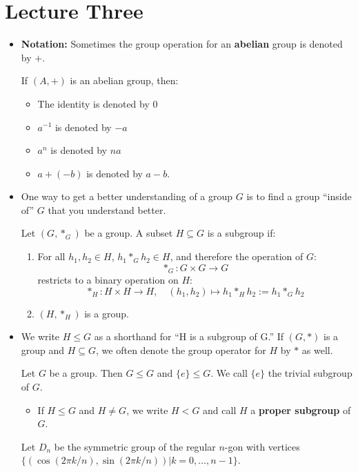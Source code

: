 \newpage
\section{Lecture Three}
\begin{itemize}
    \item \textbf{Notation:} Sometimes the group operation for an \textbf{abelian} group is denoted by $+$.
    
    If $(A,+)$ is an abelian group, then:
    \begin{itemize}
        \item The identity is denoted by $0$
        \item $a^{-1}$ is denoted by $-a$
        \item $a^n$ is denoted by $na$
        \item $a+(-b)$ is denoted by $a-b$.
    \end{itemize}
    \item One way to get a better understanding of a group $G$ is to find a group ``inside of'' $G$ that you understand better.
    \begin{definition}
        Let $(G, *_G)$ be a group. A subset $H \subseteq G$ is a subgroup if:
        \begin{enumerate}
            \item For all $h_1,h_2 \in H$, $h_1*_G h_2 \in H$, and therefore the operation of $G$:
            \begin{equation}
                *_G: G\times G \rightarrow G
            \end{equation}
            restricts to a binary operation on $H$:
            \begin{equation}
                *_H : H \times H \to H,\quad (h_1,h_2) \mapsto h_1 *_H h_2 := h_1 *_G h_2
            \end{equation}
            \item $(H, *_H)$ is a group.
        \end{enumerate}
    \end{definition}
    \item We write $H \leq G$ as a shorthand for ``H is a subgroup of G.'' If $(G, *)$ is a group and $H \subseteq G$, we often denote the group operator for $H$ by $*$ as well.
    \begin{example}
        Let $G$ be a group. Then $G \leq G$ and $\{e\} \leq G$. We call $\{e\}$ the trivial subgroup of $G$.
    \end{example}
    \begin{itemize}
        \item If $H \leq G$ and $H\neq G$, we write $H < G$ and call $H$ a \textbf{proper subgroup} of $G$.
    \end{itemize}
    \begin{example}
        Let $D_n$ be the symmetric group of the regular $n$-gon with vertices $\{(\cos (2\pi k/n), \sin (2\pi k/n)) | k=0,\dots,n-1\}$.
        \vspace{2mm}


\end{example}
\end{itemize}

